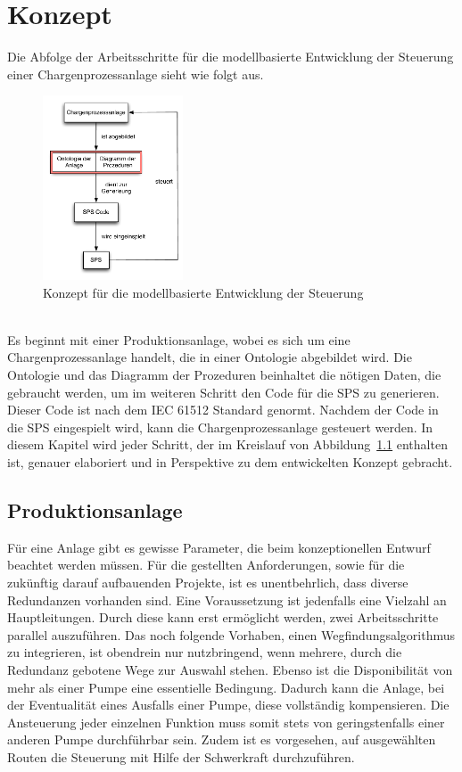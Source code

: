 
\chapter{Konzept} \label{chapter:architecture}
Die Abfolge der Arbeitsschritte für die modellbasierte Entwicklung der Steuerung einer Chargenprozessanlage sieht wie folgt aus.
\begin{figure}[h!]
		\centering
		\includegraphics[width=0.37\textwidth]{graphics/konzept/konzept_new.pdf}
		\caption{Konzept für die modellbasierte Entwicklung der Steuerung}
		\label{fig:konz_konzept_new}
\end{figure} \\
Es beginnt mit einer Produktionsanlage, wobei es sich um eine Chargenprozessanlage handelt, die in einer Ontologie abgebildet wird. Die Ontologie und das Diagramm der Prozeduren beinhaltet die nötigen Daten, die gebraucht werden, um im weiteren Schritt den Code für die SPS zu generieren. Dieser Code ist nach dem IEC 61512 Standard genormt. Nachdem der Code in die SPS eingespielt wird, kann die Chargenprozessanlage gesteuert werden. 
In diesem Kapitel wird jeder Schritt, der im Kreislauf von Abbildung~\ref{fig:konz_konzept_new} enthalten ist, genauer elaboriert und in Perspektive zu dem entwickelten Konzept gebracht.
\section{Produktionsanlage}
Für eine Anlage gibt es gewisse Parameter, die beim konzeptionellen Entwurf beachtet werden müssen. Für die gestellten Anforderungen, sowie für die zukünftig darauf aufbauenden Projekte, ist es unentbehrlich, dass diverse Redundanzen vorhanden sind. Eine Voraussetzung ist jedenfalls eine Vielzahl an Hauptleitungen. Durch diese kann erst ermöglicht werden, zwei Arbeitsschritte parallel auszuführen. Das noch folgende Vorhaben, einen Wegfindungsalgorithmus zu integrieren, ist obendrein nur nutzbringend, wenn mehrere, durch die Redundanz gebotene Wege zur Auswahl stehen. Ebenso ist die Disponibilität von mehr als einer Pumpe eine essentielle Bedingung. Dadurch kann die Anlage, bei der Eventualität eines Ausfalls einer Pumpe, diese vollständig kompensieren. Die Ansteuerung jeder einzelnen Funktion muss somit stets von geringstenfalls einer anderen Pumpe durchführbar sein. Zudem ist es vorgesehen, auf ausgewählten Routen die Steuerung mit Hilfe der Schwerkraft durchzuführen.\\

